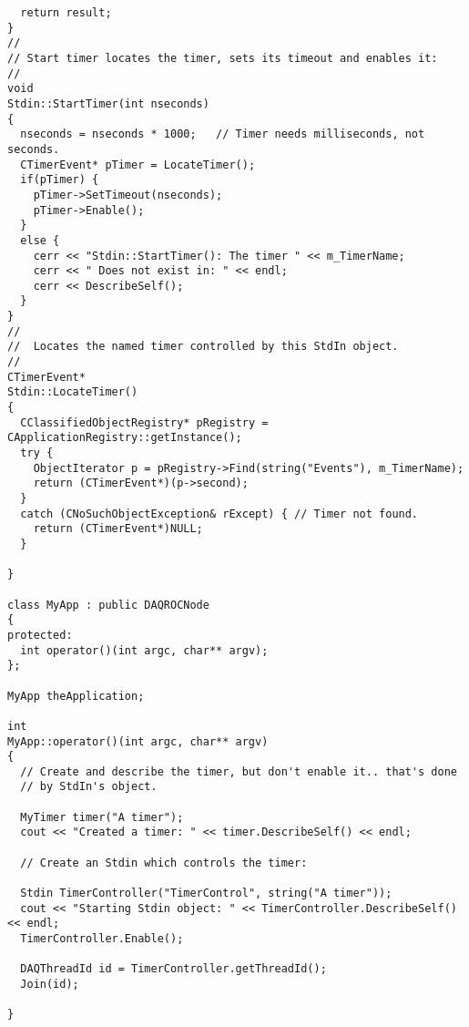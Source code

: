 \begin{verbatim}
  return result;
}
//
// Start timer locates the timer, sets its timeout and enables it:
//
void
Stdin::StartTimer(int nseconds)
{
  nseconds = nseconds * 1000;   // Timer needs milliseconds, not seconds.
  CTimerEvent* pTimer = LocateTimer();
  if(pTimer) {
    pTimer->SetTimeout(nseconds);
    pTimer->Enable();
  }
  else {
    cerr << "Stdin::StartTimer(): The timer " << m_TimerName;
    cerr << " Does not exist in: " << endl;
    cerr << DescribeSelf();
  }
}
//
//  Locates the named timer controlled by this StdIn object.
//
CTimerEvent*
Stdin::LocateTimer()
{
  CClassifiedObjectRegistry* pRegistry = CApplicationRegistry::getInstance();
  try {
    ObjectIterator p = pRegistry->Find(string("Events"), m_TimerName);
    return (CTimerEvent*)(p->second);
  }
  catch (CNoSuchObjectException& rExcept) { // Timer not found.
    return (CTimerEvent*)NULL;
  }
  
}

class MyApp : public DAQROCNode
{
protected:
  int operator()(int argc, char** argv);
};

MyApp theApplication;

int
MyApp::operator()(int argc, char** argv)
{
  // Create and describe the timer, but don't enable it.. that's done
  // by StdIn's object.

  MyTimer timer("A timer");
  cout << "Created a timer: " << timer.DescribeSelf() << endl;

  // Create an Stdin which controls the timer:

  Stdin TimerController("TimerControl", string("A timer"));
  cout << "Starting Stdin object: " << TimerController.DescribeSelf() << endl;
  TimerController.Enable();

  DAQThreadId id = TimerController.getThreadId();
  Join(id);
  
}
\end{verbatim}\normalsize 


